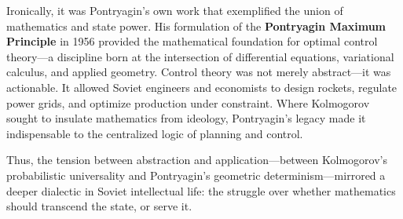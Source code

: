 Ironically, it was Pontryagin’s own work that exemplified the union of mathematics and state power. His formulation of the \textbf{Pontryagin Maximum Principle} in 1956 provided the mathematical foundation for optimal control theory—a discipline born at the intersection of differential equations, variational calculus, and applied geometry. Control theory was not merely abstract—it was actionable. It allowed Soviet engineers and economists to design rockets, regulate power grids, and optimize production under constraint. Where Kolmogorov sought to insulate mathematics from ideology, Pontryagin’s legacy made it indispensable to the centralized logic of planning and control.

Thus, the tension between abstraction and application—between Kolmogorov’s probabilistic universality and Pontryagin’s geometric determinism—mirrored a deeper dialectic in Soviet intellectual life: the struggle over whether mathematics should transcend the state, or serve it.

\vspace{1em}

